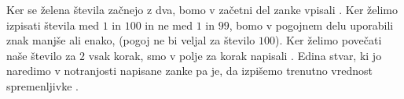 
Ker se želena števila začnejo z dva, bomo v začetni del zanke vpisali
.
Ker želimo izpisati števila med $1$ in $100$ in ne med $1$ in $99$, bomo v
pogojnem delu uporabili znak manjše ali enako, 
(pogoj  ne bi veljal za število $100$).
Ker želimo povečati naše število za $2$ vsak korak, smo v polje za korak
napisali .
Edina stvar, ki jo naredimo v notranjosti napisane zanke pa je, da izpišemo
trenutno vrednost spremenljivke .